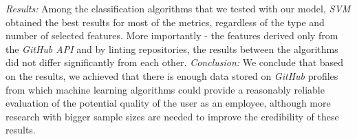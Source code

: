 {\newline
\noindent\textit{Results:}
Among the classification algorithms that we tested with our model, \emph{SVM} obtained the best results for most of the metrics, regardless of the type and number of selected features. More importantly - the features derived only from the \emph{GitHub API} and by linting repositories, the results between the algorithms did not differ significantly from each other.
\newline
\noindent\textit{Conclusion:}
We conclude that based on the results, we achieved that there is enough data stored on \emph{GitHub} profiles from which machine learning algorithms could provide a reasonably reliable evaluation of the potential quality of the user as an employee, although more research with bigger sample sizes are needed to improve the credibility of these results.
}

